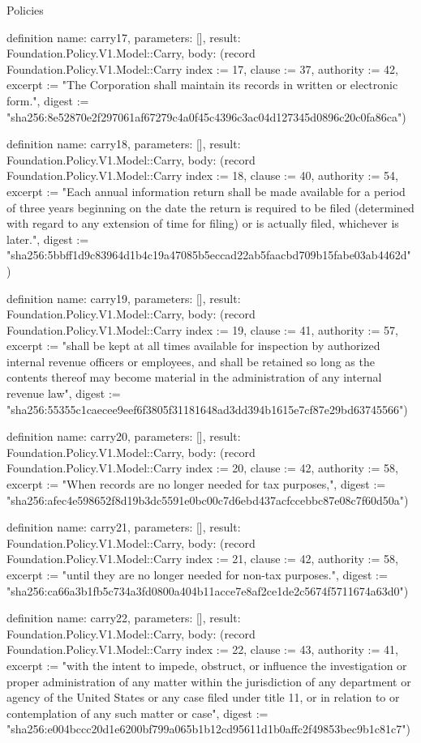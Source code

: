 \begin{lexlean}{Policies}
\begin{semanticmodule}
definition{
  name: carry17,
  parameters: [],
  result: Foundation.Policy.V1.Model::Carry,
  body: (record Foundation.Policy.V1.Model::Carry {index := 17, clause := 37, authority := 42, excerpt := "The Corporation shall maintain its records in written or electronic form.", digest := "sha256:8e52870e2f297061af67279c4a0f45c4396c3ac04d127345d0896c20c0fa86ca"})
}

definition{
  name: carry18,
  parameters: [],
  result: Foundation.Policy.V1.Model::Carry,
  body: (record Foundation.Policy.V1.Model::Carry {index := 18, clause := 40, authority := 54, excerpt := "Each annual information return shall be made available for a period of three years beginning on the date the return is required to be filed (determined with regard to any extension of time for filing) or is actually filed, whichever is later.", digest := "sha256:5bbff1d9c83964d1b4c19a47085b5eccad22ab5faacbd709b15fabe03ab4462d"})
}

definition{
  name: carry19,
  parameters: [],
  result: Foundation.Policy.V1.Model::Carry,
  body: (record Foundation.Policy.V1.Model::Carry {index := 19, clause := 41, authority := 57, excerpt := "shall be kept at all times available for inspection by authorized internal revenue officers or employees, and shall be retained so long as the contents thereof may become material in the administration of any internal revenue law", digest := "sha256:55355c1caecee9eef6f3805f31181648ad3dd394b1615e7cf87e29bd63745566"})
}

definition{
  name: carry20,
  parameters: [],
  result: Foundation.Policy.V1.Model::Carry,
  body: (record Foundation.Policy.V1.Model::Carry {index := 20, clause := 42, authority := 58, excerpt := "When records are no longer needed for tax purposes,", digest := "sha256:afec4e598652f8d19b3dc5591e0bc00c7d6ebd437acfccebbc87e08c7f60d50a"})
}

definition{
  name: carry21,
  parameters: [],
  result: Foundation.Policy.V1.Model::Carry,
  body: (record Foundation.Policy.V1.Model::Carry {index := 21, clause := 42, authority := 58, excerpt := "until they are no longer needed for non-tax purposes.", digest := "sha256:ca66a3b1fb5c734a3fd0800a404b11acce7e8af2ce1de2c5674f5711674a63d0"})
}

definition{
  name: carry22,
  parameters: [],
  result: Foundation.Policy.V1.Model::Carry,
  body: (record Foundation.Policy.V1.Model::Carry {index := 22, clause := 43, authority := 41, excerpt := "with the intent to impede, obstruct, or influence the investigation or proper administration of any matter within the jurisdiction of any department or agency of the United States or any case filed under title 11, or in relation to or contemplation of any such matter or case", digest := "sha256:e004bccc20d1e6200bf799a065b1b12cd95611d1b0affc2f49853bec9b1c81c7"})
}


\end{semanticmodule}
\end{lexlean}
